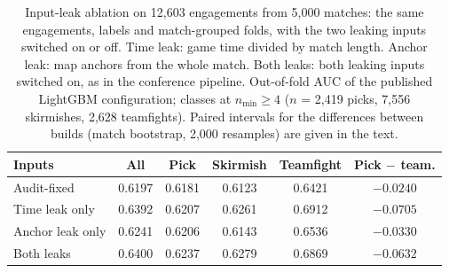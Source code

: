 \begin{table}[t]
\centering
\caption{Input-leak ablation on 12,603 engagements from 5,000 matches: the same engagements, labels and
match-grouped folds, with the two leaking inputs switched on or off. Time leak: game time divided by match
length. Anchor leak: map anchors from the whole match. Both leaks: both leaking inputs switched on, as in
the conference pipeline.
Out-of-fold AUC of the published LightGBM configuration; classes at $n_{\min} \ge 4$ ($n$ = 2,419 picks,
7,556 skirmishes, 2,628 teamfights). Paired intervals for the differences between builds (match bootstrap,
2,000 resamples) are given in the text.}
\label{tab:pred-leak}
\footnotesize
\setlength{\tabcolsep}{3pt}
\begin{tabular}{@{}lccccc@{}}
\toprule
Inputs & All & Pick & Skirmish & Teamfight & Pick $-$ team. \\
\midrule
Audit-fixed & 0.6197 & 0.6181 & 0.6123 & 0.6421 & $-0.0240$ \\
Time leak only & 0.6392 & 0.6207 & 0.6261 & 0.6912 & $-0.0705$ \\
Anchor leak only & 0.6241 & 0.6206 & 0.6143 & 0.6536 & $-0.0330$ \\
Both leaks & 0.6400 & 0.6237 & 0.6279 & 0.6869 & $-0.0632$ \\
\bottomrule
\end{tabular}
\end{table}

